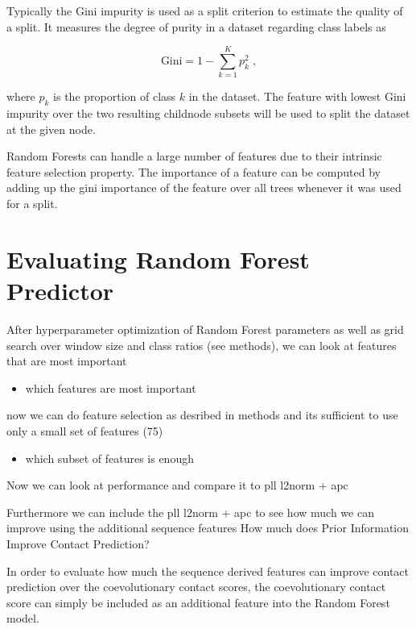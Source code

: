 \documentclass[12pt,a4paper,twoside]{book}
\providecommand{\tightlist}{%
  \setlength{\itemsep}{0pt}\setlength{\parskip}{0pt}}
\theoremstyle{definition}
\theoremstyle{definition}
\theoremstyle{remark}
\begin{document}
Typically the Gini impurity is used as a split criterion to estimate the
quality of a split. It measures the degree of purity in a dataset
regarding class labels as

\begin{equation}
  \textrm{Gini} = 1 - \sum_{k=1}^K p_k^2 \; ,
\end{equation}

where \(p_k\) is the proportion of class \(k\) in the dataset. The
feature with lowest Gini impurity over the two resulting childnode
subsets will be used to split the dataset at the given node.

Random Forests can handle a large number of features due to their
intrinsic feature selection property. The importance of a feature can be
computed by adding up the gini importance of the feature over all trees
whenever it was used for a split.

\section{Evaluating Random Forest
Predictor}\label{evaluating-random-forest-predictor}

After hyperparameter optimization of Random Forest parameters as well as
grid search over window size and class ratios (see methods), we can look
at features that are most important

\begin{itemize}
\tightlist
\item
  which features are most important
\end{itemize}

now we can do feature selection as desribed in methods and its
sufficient to use only a small set of features (75)

\begin{itemize}
\tightlist
\item
  which subset of features is enough
\end{itemize}

Now we can look at performance and compare it to pll l2norm + apc

Furthermore we can include the pll l2norm + apc to see how much we can
improve using the additional sequence features How much does Prior
Information Improve Contact Prediction?

In order to evaluate how much the sequence derived features can improve
contact prediction over the coevolutionary contact scores, the
coevolutionary contact score can simply be included as an additional
feature into the Random Forest model.
\end{document}
